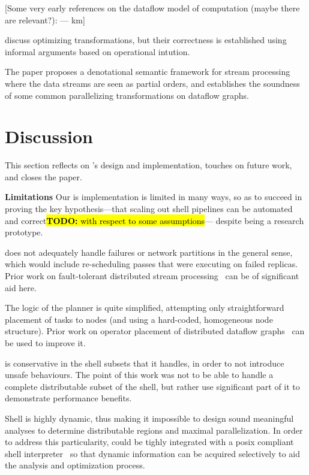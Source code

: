 \documentclass[sigplan,10pt,review,anonymous]{acmart}
\newcommand{\heading}[1]{\vspace{4pt}\noindent\textbf{#1}\enspace}
\newcommand{\TODO}[1]{\hl{\textbf{TODO:} #1}\xspace}
\newcommand{\km}[1]{[{\color{blue}#1 --- km}]}
\begin{document}

\km{Some very early references on the dataflow model of computation (maybe there are relevant?): \cite{KM1966, D1974Dataflow, K1974KPN, KMacQ1977}}
  
\cite{HSSGG2014, SHGW2015} discuss optimizing transformations, but their correctness is established using informal arguments based on operational intution.
  
The paper \cite{MSAIT2019} proposes a denotational semantic framework for stream processing where the data streams are seen as partial orders, and establishes the soundness of some common parallelizing transformations on dataflow graphs.


\section{Discussion}
\label{discussion}

This section reflects on \sys's design and implementation, touches on future work, and closes the paper.

\heading{Limitations}
Our is implementation is limited in many ways, so as to succeed in proving the key hypothesis---that scaling out shell pipelines can be automated and correct\TODO{with respect to some assumptions}--- despite \sys being a research prototype.

\sys does not adequately handle failures or network partitions in the general sense, which would include re-scheduling passes that were executing on failed replicas.
Prior work on fault-tolerant distributed stream processing~\cite{} can be of significant aid here.

The logic of the planner is quite simplified, attempting only straightforward placement of tasks to nodes (and using a hard-coded, homogeneous node structure).
Prior work on operator placement of distributed dataflow graphs~\cite{} can be used to improve it.

\sys is conservative in the shell subsets that it handles, in order to
not introduce unsafe behaviours. The point of this work was not to be
able to handle a complete distributable subset of the shell, but
rather use significant part of it to demonstrate performance benefits.

Shell is highly dynamic, thus making it impossible to design sound
meaningful analyses to determine distributable regions and maximal
parallelization. In order to address this particularity, \sys could be
tighly integrated with a posix compliant shell
interpreter~\cite{smoosh:20} so that dynamic information can be
acquired selectively to aid the analysis and optimization process.
\end{document}
